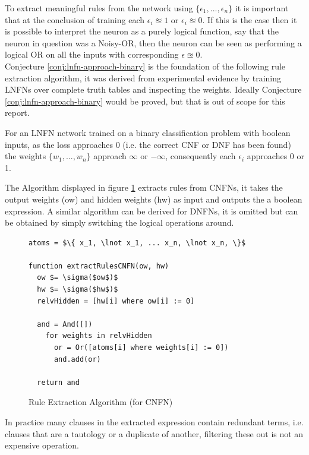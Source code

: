 To extract meaningful rules from the network using $\{ \epsilon_1, ..., \epsilon_n \}$ it is important that at the conclusion of training each $\epsilon_i \approxeq 1$ or $\epsilon_i \approxeq 0$. If this is the case then it is possible to interpret the neuron as a purely logical function, say that the neuron in question was a Noisy-OR, then the neuron can be seen as performing a logical OR on all the inputs with corresponding $\epsilon \approxeq 0$.\\

Conjecture \ref{conj:lnfn-approach-binary} is the foundation of the following rule extraction algorithm, it was derived from experimental evidence by training LNFNs over complete truth tables and inspecting the weights. Ideally Conjecture \ref{conj:lnfn-approach-binary} would be proved, but that is out of scope for this report.

\begin{conjecture}
	For an LNFN network trained on a binary classification problem with boolean inputs, as the loss approaches 0  (i.e. the correct CNF or DNF has been found) the weights $\{ w_1, ..., w_n \}$ approach $\infty$ or $-\infty$, consequently each $\epsilon_i$ approaches 0 or 1.
	\label{conj:lnfn-approach-binary}
\end{conjecture}

The Algorithm displayed in figure \ref{alg:rule-extraction} extracts rules from CNFNs, it takes the output weights (ow) and hidden weights (hw) as input and outputs the a boolean expression. A similar algorithm can be derived for DNFNs, it is omitted but can be obtained by simply switching the logical operations around.

\begin{figure}[H]
	\begin{lstlisting}[mathescape=true]
atoms = $\{ x_1, \lnot x_1, ... x_n, \lnot x_n, \}$
	
function extractRulesCNFN(ow, hw)
  ow $= \sigma($ow$)$
  hw $= \sigma($hw$)$
  relvHidden = [hw[i] where ow[i] := 0]
		
  and = And([])
    for weights in relvHidden
      or = Or([atoms[i] where weights[i] := 0])
      and.add(or)
		
  return and
	\end{lstlisting}
	\caption{Rule Extraction Algorithm (for CNFN)}
	\label{alg:rule-extraction}
\end{figure}

In practice many clauses in the extracted expression contain redundant terms, i.e. clauses that are a tautology or a duplicate of another, filtering these out is not an expensive operation.\\

